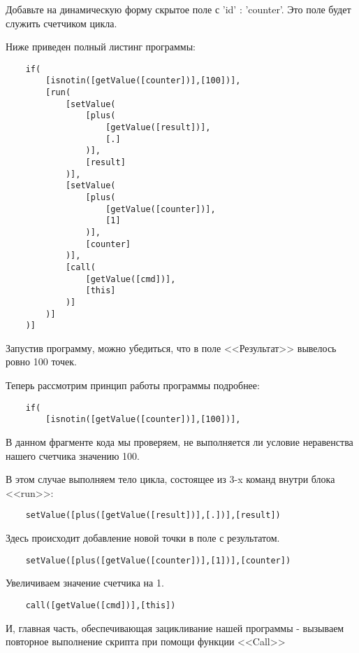 \documentclass[../index.tex]{subfiles}
\begin{document}
    Добавьте  на динамическую форму скрытое поле с 'id' : 'counter'. Это поле будет служить счетчиком цикла.
    
    Ниже приведен полный листинг программы:
    
    \begin{verbatim}
    if(
        [isnotin([getValue([counter])],[100])],
        [run(
            [setValue(
                [plus(
                    [getValue([result])],
                    [.]
                )],
                [result]
            )],
            [setValue(
                [plus(
                    [getValue([counter])],
                    [1]
                )],
                [counter]
            )],
            [call(
                [getValue([cmd])],
                [this]
            )]
        )]
    )]
    \end{verbatim}
    
    Запустив программу, можно убедиться, что в поле <<Результат>> вывелось ровно 100 точек.
    
    Теперь рассмотрим принцип работы программы подробнее:
    
    \begin{verbatim}
    if(
        [isnotin([getValue([counter])],[100])],
    \end{verbatim}
    
    В данном фрагменте кода мы проверяем, не выполняется ли условие неравенства нашего счетчика значению 100.
    
    В этом случае выполняем тело цикла, состоящее из 3-x команд внутри блока <<run>>:
    
    \begin{verbatim}
    setValue([plus([getValue([result])],[.])],[result])
    \end{verbatim}
    
    Здесь происходит добавление новой точки в поле с результатом.
    
    \begin{verbatim}
    setValue([plus([getValue([counter])],[1])],[counter])
    \end{verbatim}
    
    Увеличиваем значение счетчика на 1.
    
    \begin{verbatim}
    call([getValue([cmd])],[this])
    \end{verbatim}
    
    И, главная часть, обеспечивающая зацикливание нашей программы - вызываем повторное выполнение скрипта при помощи функции
    <<Call>>
    
\end{document}
